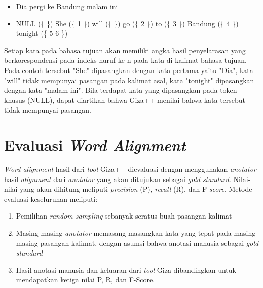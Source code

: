 \begin{itemize}
	\item Dia pergi ke Bandung malam ini
	\item NULL (\{ \}) She (\{ 1 \}) will (\{ \}) go (\{ 2 \}) to (\{ 3 \}) Bandung (\{ 4 \}) tonight (\{ 5 6 \})
\end{itemize}

Setiap kata pada bahasa tujuan akan memiliki angka hasil penyelarasan yang berkorespondensi pada indeks huruf ke-n pada kata di kalimat bahasa tujuan. Pada contoh tersebut "She" dipasangkan dengan kata pertama yaitu "Dia", kata "will" tidak mempunyai pasangan pada kalimat asal, kata "tonight" dipasangkan dengan kata "malam ini". Bila terdapat kata yang dipasangkan pada token khusus (NULL), dapat diartikan bahwa Giza++ menilai bahwa kata tersebut tidak mempunyai pasangan.

\section{Evaluasi \textit{Word Alignment}} \label{sec:pembentukanTdanH}
\textit{Word alignment} hasil dari \textit{tool} Giza++ dievaluasi dengan menggunakan \textit{anotator} hasil \textit{alignment} dari \textit{anotator} yang akan ditujukan sebagai \textit{gold standard}. Nilai-nilai yang akan dihitung meliputi \textit{precision} (P), \textit{recall} (R), dan F-\textit{score}. Metode evaluasi keseluruhan meliputi:

\begin{enumerate}
	\item Pemilihan \textit{random sampling} sebanyak seratus buah pasangan kalimat
	\item Masing-masing \textit{anotator} memasang-masangkan kata yang tepat pada masing-masing pasangan kalimat, dengan asumsi bahwa anotasi manusia sebagai \textit{gold standard}
	\item Hasil anotasi manusia dan keluaran dari \textit{tool} Giza dibandingkan untuk mendapatkan ketiga nilai P, R, dan F-Score.
\end{enumerate}


